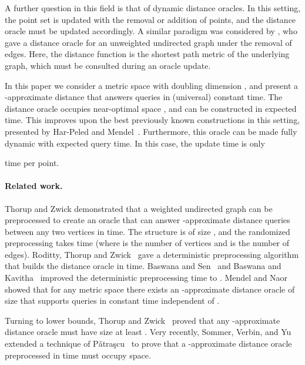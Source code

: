 \documentclass[11pt]{article}
\begin{document}
A further question in this field is that of dynamic distance oracles. In this
setting, the point set  is updated with the removal or addition of points,
and the distance oracle must be updated accordingly. A similar paradigm was considered
by \cite{RZ04}, who gave a distance oracle for an unweighted undirected graph under the 
removal of edges. Here, the distance function is the shortest path metric of the 
underlying graph, which must be consulted during an oracle update.

In this paper we consider a metric space with doubling dimension ,
and present a -approximate distance that answers
queries in (universal) constant time. The distance oracle occupies near-optimal space
, and
can be constructed in 
  expected  time.
This improves upon the best previously known constructions in this setting, presented by 
Har-Peled and Mendel~\cite{HaPe06}.
Furthermore, this oracle can be made fully dynamic with expected  query time. In this case, 
the update time is only

time per point. 


\paragraph{Related work.}
Thorup and Zwick \cite{ThZw05} demonstrated that a weighted undirected graph can be
preprocessed to create an oracle that can answer -approximate
distance queries between any two vertices in  time. The structure is
of size , and the randomized preprocessing takes
 time (where  is the number of vertices and  is the
number of edges). Roditty, Thorup and Zwick~\cite{RoThZw05} gave a
deterministic preprocessing algorithm that builds the distance oracle in
 time. Baswana and Sen~\cite{BaSe06} and Baswana and
Kavitha~\cite{BaKa06} improved the deterministic preprocessing time to
. Mendel and Naor~\cite{MeNa06} showed
that for any metric space there exists an -approximate distance
oracle of size  that supports queries in constant time
independent of .

Turning to lower bounds, Thorup and Zwick~\cite{ThZw05} proved that any
-approximate distance oracle must have size at least
. Very recently, Sommer, Verbin, and
Yu~\cite{SoVeYu09} extended a technique of P\v{a}tra\c{s}cu~\cite{Pa08} to
prove that a -approximate distance oracle preprocessed in  time must
occupy  space.
\end{document}
